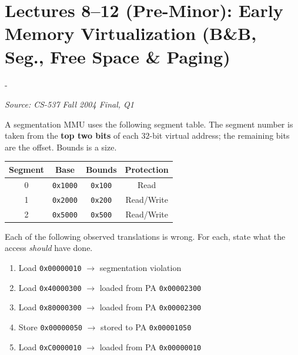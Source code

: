 \documentclass[11pt,a4paper]{article}
\makeatletter
\newcommand{\keepspace}[1]{\par\penalty-100\begingroup
  \setlength{\dimen@}{#1}\dimen@ii\pagegoal\advance\dimen@ii-\pagetotal
  \ifdim\dimen@>\dimen@ii\ifdim\dimen@ii>\z@\vfil\fi\break\fi\endgroup}
\newcounter{qn}[section]
\newenvironment{Qn}[4]{%
  \refstepcounter{qn}\keepspace{7\baselineskip}%
  \begin{tcolorbox}[qboxstyle, title={Q\thesection.\theqn\ \ [#1 \textbar\ #2]\ \ #4}]%
  {\footnotesize\color{g3}\textit{Source: #3}}\par\smallskip%
}{%
  \end{tcolorbox}%
}
\makeatother
\begin{document}
\clearpage

\section{Lectures 8--12 (Pre-Minor): Early Memory Virtualization (B\&B, Seg., Free Space \& Paging)}

\begin{Qn}{Hard}{Lect 10}{CS-537 Fall 2004 Final, Q1}{Broken segment-table translations (explicit 2-bit SEG\_MASK)}
A segmentation MMU uses the following segment table. The segment number
is taken from the \textbf{top two bits} of each $32$-bit virtual
address; the remaining bits are the offset. Bounds is a size.

\begin{center}
\begin{tabular}{c|c|c|c}
Segment & Base & Bounds & Protection \\
\hline
0 & \texttt{0x1000} & \texttt{0x100} & Read \\
1 & \texttt{0x2000} & \texttt{0x200} & Read/Write \\
2 & \texttt{0x5000} & \texttt{0x500} & Read/Write \\
\end{tabular}
\end{center}

Each of the following observed translations is wrong. For each, state
what the access \emph{should} have done.
\begin{enumerate}
  \item[(a)] Load \texttt{0x00000010} $\to$ segmentation violation
  \item[(b)] Load \texttt{0x40000300} $\to$ loaded from PA
        \texttt{0x00002300}
  \item[(c)] Load \texttt{0x80000300} $\to$ loaded from PA
        \texttt{0x00002300}
  \item[(d)] Store \texttt{0x00000050} $\to$ stored to PA
        \texttt{0x00001050}
  \item[(e)] Load \texttt{0xC0000010} $\to$ loaded from PA
        \texttt{0x00000010}
\end{enumerate}
\end{Qn}
\end{document}

